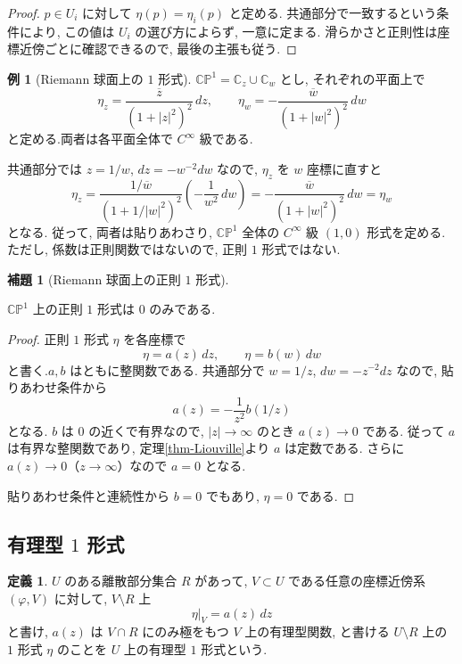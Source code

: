 \documentclass[dvipdfmx,a4paper,11pt]{article} %
\newcommand{\C}{\mathbb{C}}
\theoremstyle{definition}
\numberwithin{equation}{section}
\newtheorem{lem}[thm]{補題}
\newtheorem{dfn}[thm]{定義}
\newtheorem{exa}[thm]{例}
\begin{document}
\begin{proof}
$p\in U_i$ に対して $\eta(p)=\eta_i(p)$ と定める.
共通部分で一致するという条件により, 
この値は $U_i$ の選び方によらず, 一意に定まる.
滑らかさと正則性は座標近傍ごとに確認できるので, 最後の主張も従う.
\end{proof}

\begin{exa}[Riemann 球面上の $1$ 形式]
\label{exa-sphere-smooth-one-form}
$\C\mathbb P^1=\C_z\cup\C_w$ とし, それぞれの平面上で
\[
\eta_z=\frac{\overline z}{(1+|z|^2)^2}\,dz,\qquad
\eta_w=-\frac{\overline w}{(1+|w|^2)^2}\,dw
\]
と定める.両者は各平面全体で $C^\infty$ 級である.

共通部分では $z=1/w$, $dz=-w^{-2}dw$ なので, 
$\eta_z$ を $w$ 座標に直すと
\[
\eta_z
=\frac{1/\overline w}{(1+1/|w|^2)^2}
 \left(-\frac1{w^2}\,dw\right)
=-\frac{\overline w}{(1+|w|^2)^2}\,dw
=\eta_w
\]
となる.
従って, 両者は貼りあわさり, 
$\C\mathbb P^1$ 全体の $C^\infty$ 級 $(1,0)$ 形式を定める.
ただし, 係数は正則関数ではないので, 正則 $1$ 形式ではない.

\end{exa}

\begin{lem}[Riemann 球面上の正則 $1$ 形式]\label{lem-no-holomorphic-form-sphere}

$\C\mathbb P^1$ 上の正則 $1$ 形式は $0$ のみである.

\end{lem}
\begin{proof}
正則 $1$ 形式 $\eta$ を各座標で
\[
\eta=a(z)\,dz,\qquad \eta=b(w)\,dw
\]
と書く.$a,b$ はともに整関数である.
共通部分で $w=1/z$, $dw=-z^{-2}dz$ なので, 
貼りあわせ条件から
\[
a(z)=-\frac1{z^2}b(1/z)
\]
となる.
$b$ は $0$ の近くで有界なので, $|z|\to\infty$ のとき $a(z)\to0$ である.
従って $a$ は有界な整関数であり, 定理\ref{thm-Liouville}より $a$ は定数である. さらに $a(z)\to0$（$z\to\infty$）なので $a=0$ となる.

貼りあわせ条件と連続性から $b=0$ でもあり, $\eta=0$ である.
\end{proof}

\subsection{有理型 $1$ 形式}\label{sec-meromorphic-one-forms}

\begin{dfn}\label{O-M092}
$U$ のある離散部分集合 $R$ があって, $V\subset U$ である任意の座標近傍系 $(\varphi,V)$ に対して, $V\setminus R$ 上
\[
\eta|_V=a(z)\,dz
\]
と書け, $a(z)$ は $V\cap R$ にのみ極をもつ $V$ 上の有理型関数, と書ける $U\setminus R$ 上の $1$ 形式 $\eta$ のことを $U$ 上の有理型 $1$ 形式という.
\end{dfn}
\end{document}
